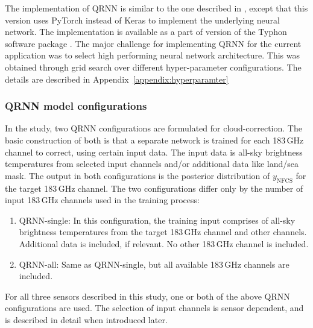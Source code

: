\documentclass[amt, manuscript]{copernicus}
\newcommand{\ynfcs}{y_\text{NFCS}}
\begin{document}
The implementation of QRNN is similar to the one described in
\citet{pfreundschuh:aneur:18}, except that this version uses PyTorch
\citep{paszke2017automatic} instead of Keras \citep{chollet2015keras} to
implement the underlying neural network. The implementation is available as a
part of version of the Typhon software package \citep{typhonv08}. The major
challenge for implementing QRNN for the current application was to select high
performing neural network architecture. This was obtained through grid search
over different hyper-parameter configurations. The details are described in
Appendix~\ref{appendix:hyperparamter}

\subsubsection{QRNN model configurations}
%
\label{sec:QRNN_configuration}
In the study, two QRNN configurations are formulated for cloud-correction. The
basic construction of both is that a separate network is trained for each
183\,GHz channel to correct, using certain input data. The input data is all-sky brightness temperatures from selected input channels and/or additional data like land/sea mask. The
output in both configurations is the posterior distribution of $\ynfcs$ for
the target 183\,GHz channel. The two configurations differ only by the number of
input 183\,GHz channels used in the training process:

\begin{enumerate}
	\item QRNN-single: In this configuration, the training input comprises of  all-sky brightness temperatures from the target 183\,GHz channel and other channels. Additional data is included, if relevant. No other 183\,GHz channel is included.  
	
	\item QRNN-all: Same as QRNN-single, but all available 183\,GHz channels are included.      
\end{enumerate}

For all three sensors described in this study, one or both of the above QRNN configurations are used. The selection of input channels is sensor dependent, and is described in detail when introduced later.  
\end{document}
